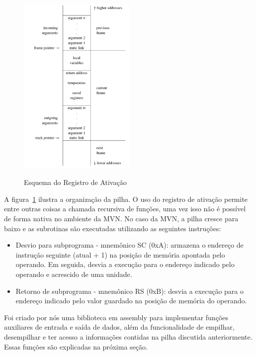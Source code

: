 \begin{figure}[ht]
	\centering
	\caption{Esquema do Registro de Ativação}
	\includegraphics[width=0.5\textwidth]{images/registros-ativacao.png}
	\label{fig:registros-ativacao}
\end{figure}

A figura~\ref{fig:registros-ativacao} ilustra a organização da pilha. O uso do registro de ativação permite entre outras coisas a chamada recursiva de funções, uma vez isso não é possível de forma nativa no ambiente da MVN. No caso da MVN, a pilha cresce para baixo e as subrotinas são executadas utilizando as seguintes instruções:

\begin{itemize}
	\item Desvio para subprograma - mnemônico SC (0xA): armazena o endereço de instrução seguinte (atual + 1) na posição de memória apontada pelo operando. Em seguida, desvia a execução para o endereço indicado pelo operando e acrescido de uma unidade.
	
	\item Retorno de subprograma - mnemônico RS (0xB): desvia a execução para o endereço indicado pelo valor guardado na posição de memória do operando.
\end{itemize}

Foi criado por nós uma biblioteca em assembly para implementar funções auxiliares de entrada e saída de dados, além da funcionalidade de empilhar, desempilhar e ter acesso a informações contidas na pilha discutida anteriormente. Essas funções são explicadas na próxima seção.
